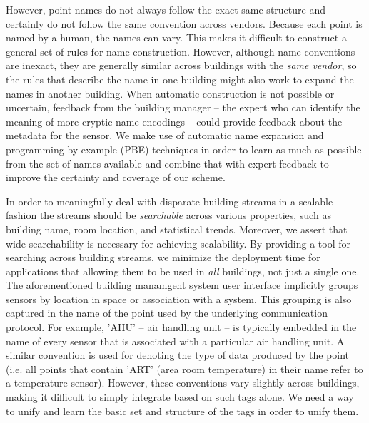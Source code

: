 However, point names do not 
always follow the exact same structure and certainly do not follow the same convention 
across vendors.  Because each
point is named by a human, the names can vary. This makes it difficult to construct a general
set of rules for name construction. However, although name conventions are inexact, they 
are generally similar across buildings with the \emph{same vendor}, so the rules that 
describe the name in one building might also work to expand the names in another building.
When automatic construction is not possible or
uncertain, feedback from the building manager -- the expert who can identify the meaning of 
more cryptic name encodings -- could provide feedback about the metadata for the sensor.
We make use of automatic name expansion and programming by example (PBE) 
techniques in order to learn
as much as possible from the set of names available and combine that with expert feedback to
improve the certainty and coverage of our scheme.

In order to meaningfully deal with disparate building streams in a scalable 
fashion the streams should be \emph{searchable} across various properties, such
as building name, room location, and statistical trends.  Moreover, we
assert that wide searchability is necessary for achieving scalability.  By providing a tool for
searching across building streams, we minimize the deployment time for applications that 
allowing them to be used in \emph{all} buildings, not just a single one.  The aforementioned 
building manamgent system user interface implicitly groups sensors by location in space
or association with a system.  This grouping is also captured in the name of the point used by
the underlying communication protocol.  For example, 'AHU' -- air handling unit -- is typically
embedded in the name of every sensor that is associated with a particular air handling unit.
A similar convention is used for denoting the type of data produced by the point (i.e. all points
that contain 'ART' (area room temperature)  in their name refer to a temperature sensor).
However, these conventions vary slightly across buildings, making it difficult to
simply integrate based on such tags alone.  We need a way to unify and learn the basic
set and structure of the tags in order to unify them.

